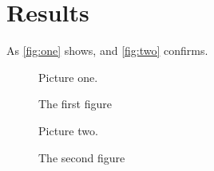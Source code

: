 \documentclass{article}
\begin{document}
\section{Results}
As \autoref{fig:one} shows, and \autoref{fig:two} confirms.
\begin{figure}[h]
\centering
Picture one.
\caption{The first figure}\label{fig:one}
\end{figure}
\begin{figure}[h]
\centering
Picture two.
\caption{The second figure}\label{fig:two}
\end{figure}
\end{document}
